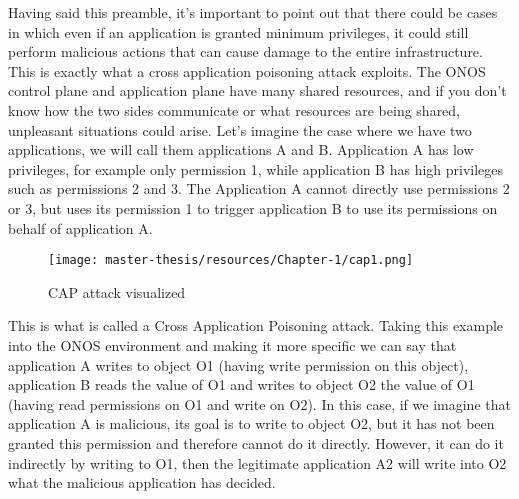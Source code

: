 \documentclass[a4paper,10pt]{memoir}
\begin{document}
Having said this preamble, it's important to point out that there could be cases in which even if an application is granted minimum privileges, it could still perform malicious actions that can cause damage to the entire infrastructure. This is exactly what a cross application poisoning attack exploits. The ONOS control plane and application plane have many shared resources, and if you don't know how the two sides communicate or what resources are being shared, unpleasant situations could arise. Let's imagine the case where we have two applications, we will call them applications A and B. Application A has low privileges, for example only permission 1, while application B has high privileges such as permissions 2 and 3. The Application A cannot directly use permissions 2 or 3, but uses its permission 1 to trigger application B to use its permissions on behalf of application A.
\begin{figure}[t]
\caption{CAP attack visualized}
\label{fig:cap1}
\texttt{[image: master-thesis/resources/Chapter-1/cap1.png]}
\centering
\end{figure}
This is what is called a Cross Application Poisoning attack. Taking this example into the ONOS environment and making it more specific we can say that application A writes to object O1 (having write permission on this object), application B reads the value of O1 and writes to object O2 the value of O1 (having read permissions on O1 and write on O2). In this case, if we imagine that application A is malicious, its goal is to write to object O2, but it has not been granted this permission and therefore cannot do it directly. However, it can do it indirectly by writing to O1, then the legitimate application A2 will write into O2 what the malicious application has decided.
\end{document}
